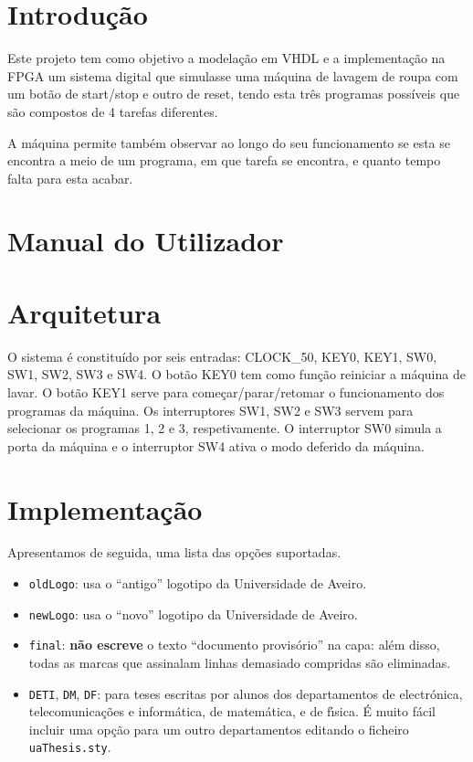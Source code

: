 

%
%

\tableofcontents



\chapter{Introdução}

	Este projeto tem como objetivo a modelação em VHDL e a implementação na FPGA um sistema digital que simulasse uma máquina de lavagem de roupa com um botão de start/stop e outro de reset, tendo esta três programas possíveis que são compostos de 4 tarefas diferentes.

	A máquina permite também observar ao longo do seu funcionamento se esta se encontra a meio de um programa, em que tarefa se encontra, e quanto tempo falta para esta acabar.

\chapter{Manual do Utilizador}

	

\chapter{Arquitetura}

O sistema é constituído por seis entradas: CLOCK\_50, KEY0, KEY1, SW0, SW1, SW2, SW3 e SW4. 
 O botão KEY0 tem como função reiniciar a máquina de lavar. O botão KEY1 serve para começar/parar/retomar o funcionamento dos programas da máquina. Os interruptores SW1, SW2 e SW3 servem para selecionar os programas 1, 2 e 3, respetivamente. O interruptor SW0 simula a porta da máquina e o interruptor SW4 ativa o modo deferido da máquina. 

\chapter{Implementação}

Apresentamos de seguida, uma lista das opções suportadas.
\begin{itemize}
  \item \verb+oldLogo+: usa o ``antigo'' logotipo da Universidade de Aveiro.
  \item \verb+newLogo+: usa o ``novo'' logotipo da Universidade de Aveiro.
  \item \verb+final+: \textbf{n\~ao escreve} o texto ``documento provis\'orio'' na capa: al\'em
        disso, todas as marcas que assinalam linhas demasiado compridas s\~ao eliminadas.
  \item \verb+DETI+, \verb+DM+, \verb+DF+: para teses escritas por alunos dos departamentos de
        electr\'onica, telecomunica\c c\~oes e inform\'atica, de matem\'atica, e de f\'\i sica.
        \'E muito f\'acil incluir uma op\c c\~ao para um outro departamentos editando o
        ficheiro \verb+uaThesis.sty+.
\end{itemize}

